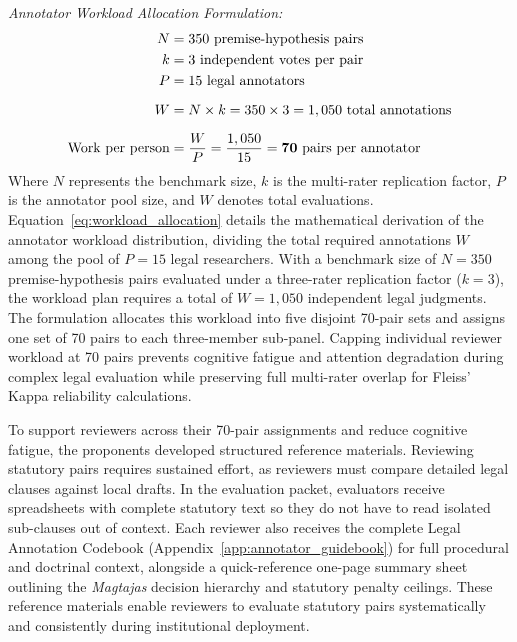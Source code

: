     \noindent\textit{Annotator Workload Allocation Formulation:}
    \begin{equation}
    \begin{aligned}
    N &= 350 \text{ premise-hypothesis pairs} \\
    k &= 3 \text{ independent votes per pair} \\
    P &= 15 \text{ legal annotators} \\[6pt]
    W &= N \times k = 350 \times 3 = 1,050 \text{ total annotations} \\[6pt]
    \text{Work per person} &= \frac{W}{P} = \frac{1,050}{15} = \mathbf{70 \text{ pairs per annotator}}
    \end{aligned}
    \label{eq:workload_allocation}
    \eqcaption{Annotator Workload Allocation Formulation}
    \end{equation}
    \noindent Where $N$ represents the benchmark size, $k$ is the multi-rater replication factor, $P$ is the annotator pool size, and $W$ denotes total evaluations. Equation~\ref{eq:workload_allocation} details the mathematical derivation of the annotator workload distribution, dividing the total required annotations $W$ among the pool of $P = 15$ legal researchers. With a benchmark size of $N = 350$ premise-hypothesis pairs evaluated under a three-rater replication factor ($k = 3$), the workload plan requires a total of $W = 1,050$ independent legal judgments. The formulation allocates this workload into five disjoint 70-pair sets and assigns one set of 70 pairs to each three-member sub-panel. Capping individual reviewer workload at 70 pairs prevents cognitive fatigue and attention degradation during complex legal evaluation while preserving full multi-rater overlap for Fleiss' Kappa reliability calculations.

    To support reviewers across their 70-pair assignments and reduce cognitive fatigue, the proponents developed structured reference materials. Reviewing statutory pairs requires sustained effort, as reviewers must compare detailed legal clauses against local drafts. In the evaluation packet, evaluators receive spreadsheets with complete statutory text so they do not have to read isolated sub-clauses out of context. Each reviewer also receives the complete Legal Annotation Codebook (Appendix~\ref{app:annotator_guidebook}) for full procedural and doctrinal context, alongside a quick-reference one-page summary sheet outlining the \textit{Magtajas} decision hierarchy and statutory penalty ceilings. These reference materials enable reviewers to evaluate statutory pairs systematically and consistently during institutional deployment.

